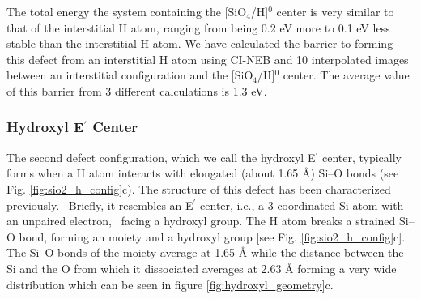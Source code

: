 \documentclass[aps,prb,reprint,superscriptaddress,showpacs]{revtex4-1}
\begin{document}
The total energy the system containing the [SiO$_4$/H]$^0$ center is very similar to that of the interstitial H atom, ranging from being 0.2 eV more to 0.1 eV less stable than the interstitial H atom. We have calculated the barrier to forming this defect from an interstitial H atom using CI-NEB and 10 interpolated images between an interstitial configuration and the [SiO$_4$/H]$^0$ center. The average value of this barrier from 3 different calculations is 1.3 eV. 


\subsubsection*{Hydroxyl E$^\prime$ Center}

The second defect configuration, which we call the hydroxyl E$^\prime$ center, typically forms when a H atom interacts with elongated (about 1.65 {\AA}) \mbox{Si--O} bonds (see Fig. \ref{fig:sio2_h_config}c). The structure of this defect has been characterized previously.~\cite{aelsayed_prl} Briefly, it resembles an E$^\prime$ center, i.e., a 3-coordinated Si atom with an unpaired electron,~\cite{rudra_eprime} facing a hydroxyl group. The H atom breaks a strained \mbox{Si--O} bond, forming an \hspace{2 pt} moiety and a hydroxyl group [see Fig. \ref{fig:sio2_h_config}c]. The \mbox{Si--O} bonds of the \hspace{2 pt} moiety average at 1.65 {\AA} while the distance between the Si and the O from which it dissociated averages at 2.63 {\AA} forming a very wide distribution which can be seen in figure \ref{fig:hydroxyl_geometry}c. 
\end{document}
